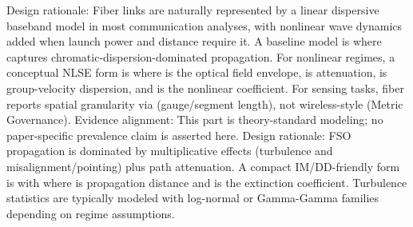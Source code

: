 {}\markdownRendererSectionBegin
{}\markdownRendererInterblockSeparator
{}Design rationale: Fiber links are naturally represented by a linear dispersive baseband model in most communication analyses, with nonlinear wave dynamics added when launch power and distance require it.\markdownRendererParagraphSeparator
{}A baseline model is\markdownRendererSoftLineBreak
{}\markdownRendererSoftLineBreak
{}where  captures chromatic-dispersion-dominated propagation.\markdownRendererParagraphSeparator
{}For nonlinear regimes, a conceptual NLSE form is\markdownRendererSoftLineBreak
{}\markdownRendererSoftLineBreak
{}where  is the optical field envelope, \markdownRendererInlineMath{\alpha} is attenuation,  is group-velocity dispersion, and \markdownRendererInlineMath{\gamma} is the nonlinear coefficient. For sensing tasks, fiber reports spatial granularity via  (gauge/segment length), not wireless-style  (Metric Governance).\markdownRendererParagraphSeparator
{}Evidence alignment: This part is theory-standard modeling; no paper-specific prevalence claim is asserted here.\markdownRendererInterblockSeparator
{}
\markdownRendererSectionEnd \markdownRendererSectionBegin
{}\markdownRendererInterblockSeparator
{}Design rationale: FSO propagation is dominated by multiplicative effects (turbulence and misalignment/pointing) plus path attenuation.\markdownRendererParagraphSeparator
{}A compact IM/DD-friendly form is\markdownRendererSoftLineBreak
{}\markdownRendererSoftLineBreak
{}with\markdownRendererSoftLineBreak
{}\markdownRendererSoftLineBreak
{}where  is propagation distance and \markdownRendererInlineMath{\kappa} is the extinction coefficient. Turbulence statistics are typically modeled with log-normal or Gamma-Gamma families depending on regime assumptions.\markdownRendererParagraphSeparator
